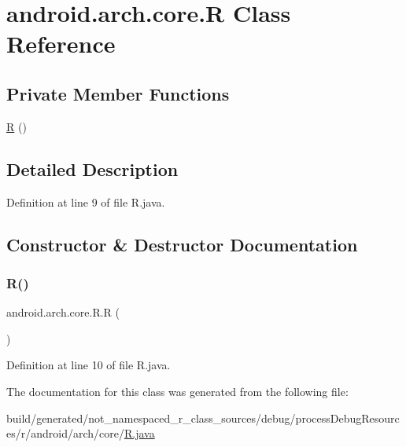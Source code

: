\hypertarget{classandroid_1_1arch_1_1core_1_1_r}{}\section{android.\+arch.\+core.\+R Class Reference}
\label{classandroid_1_1arch_1_1core_1_1_r}
\subsection*{Private Member Functions}
\begin{DoxyCompactItemize}
\item 
\mbox{\hyperlink{classandroid_1_1arch_1_1core_1_1_r_a208fbbbf2db3d61dda377513d31cc5be}{R}} ()
\end{DoxyCompactItemize}


\subsection{Detailed Description}


Definition at line 9 of file R.\+java.



\subsection{Constructor \& Destructor Documentation}
\mbox{\label{classandroid_1_1arch_1_1core_1_1_r_a208fbbbf2db3d61dda377513d31cc5be}} 
\subsubsection{\texorpdfstring{R()}{R()}}
{\footnotesize\ttfamily android.\+arch.\+core.\+R.\+R (\begin{DoxyParamCaption}{ }\end{DoxyParamCaption})\hspace{0.3cm}{\ttfamily [private]}}



Definition at line 10 of file R.\+java.


\begin{DoxyCode}{0}

\end{DoxyCode}


The documentation for this class was generated from the following file\+:\begin{DoxyCompactItemize}
\item 
build/generated/not\+\_\+namespaced\+\_\+r\+\_\+class\+\_\+sources/debug/process\+Debug\+Resources/r/android/arch/core/\mbox{\hyperlink{android_2arch_2core_2_r_8java}{R.\+java}}\end{DoxyCompactItemize}
